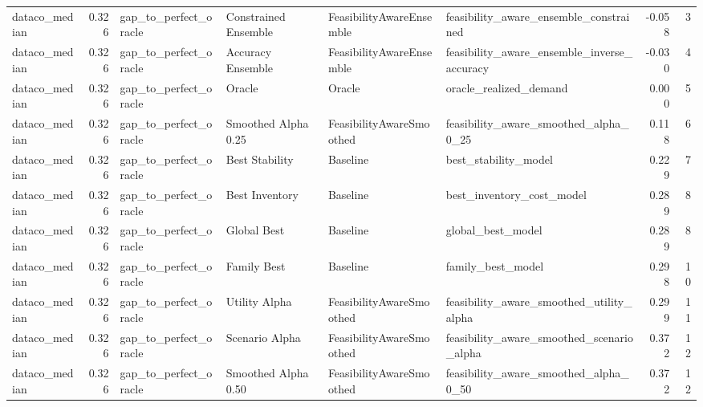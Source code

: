 \begin{table}
{\begin{tabular}{lrllllrr}
 dataco\_median &             0.326 &       gap\_to\_perfect\_oracle &  Constrained Ensemble &  FeasibilityAwareEnsemble &             feasibility\_aware\_ensemble\_constrained &        -0.058 &               3 \\
 dataco\_median &             0.326 &       gap\_to\_perfect\_oracle &     Accuracy Ensemble &  FeasibilityAwareEnsemble &        feasibility\_aware\_ensemble\_inverse\_accuracy &        -0.030 &               4 \\
 dataco\_median &             0.326 &       gap\_to\_perfect\_oracle &                Oracle &                    Oracle &                             oracle\_realized\_demand &         0.000 &               5 \\
 dataco\_median &             0.326 &       gap\_to\_perfect\_oracle &   Smoothed Alpha 0.25 &  FeasibilityAwareSmoothed &              feasibility\_aware\_smoothed\_alpha\_0\_25 &         0.118 &               6 \\
 dataco\_median &             0.326 &       gap\_to\_perfect\_oracle &        Best Stability &                  Baseline &                               best\_stability\_model &         0.229 &               7 \\
 dataco\_median &             0.326 &       gap\_to\_perfect\_oracle &        Best Inventory &                  Baseline &                          best\_inventory\_cost\_model &         0.289 &               8 \\
 dataco\_median &             0.326 &       gap\_to\_perfect\_oracle &           Global Best &                  Baseline &                                  global\_best\_model &         0.289 &               8 \\
 dataco\_median &             0.326 &       gap\_to\_perfect\_oracle &           Family Best &                  Baseline &                                  family\_best\_model &         0.298 &              10 \\
 dataco\_median &             0.326 &       gap\_to\_perfect\_oracle &         Utility Alpha &  FeasibilityAwareSmoothed &           feasibility\_aware\_smoothed\_utility\_alpha &         0.299 &              11 \\
 dataco\_median &             0.326 &       gap\_to\_perfect\_oracle &        Scenario Alpha &  FeasibilityAwareSmoothed &          feasibility\_aware\_smoothed\_scenario\_alpha &         0.372 &              12 \\
 dataco\_median &             0.326 &       gap\_to\_perfect\_oracle &   Smoothed Alpha 0.50 &  FeasibilityAwareSmoothed &              feasibility\_aware\_smoothed\_alpha\_0\_50 &         0.372 &              12 \\

\end{tabular}}
\end{table}
